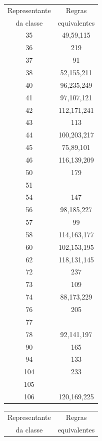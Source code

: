 \documentclass[12pt,a4paper]{article}
\begin{document}
\begin{table}[H]
\begin{minipage}[b]{0.3\linewidth}
\begin{tabular}{|c|c|}
\hline
\footnotesize Representante & \footnotesize Regras \\
{\footnotesize da classe} & \footnotesize equivalentes \\ \hline
35  & 49,59,115 \\ \hline
36  & 219 \\ \hline
37  & 91 \\ \hline
38  & 52,155,211 \\ \hline
40  & 96,235,249 \\ \hline
41  & 97,107,121 \\ \hline
42  & 112,171,241 \\ \hline
43  & 113 \\ \hline
44  & 100,203,217 \\ \hline
45  & 75,89,101 \\ \hline
46  & 116,139,209 \\ \hline
50  & 179 \\ \hline
51  & \\ \hline
54  & 147 \\ \hline
56  & 98,185,227 \\ \hline
57  & 99 \\ \hline
58  & 114,163,177 \\ \hline
60  & 102,153,195 \\ \hline
62  & 118,131,145 \\ \hline
72  & 237 \\ \hline
73  & 109 \\ \hline
74  & 88,173,229 \\ \hline
76  & 205 \\ \hline
77  & \\ \hline
78  & 92,141,197 \\ \hline
90  & 165 \\ \hline
94  & 133 \\ \hline
104 & 233 \\ \hline
105 & \\ \hline
106 & 120,169,225 \\ \hline
\end{tabular}
\end{minipage}
\hspace{0.3cm}
\begin{minipage}[b]{0.3\linewidth}
\centering
\begin{tabular}{|c|c|}
\hline
\footnotesize Representante & \footnotesize Regras \\
{\footnotesize da classe} & \footnotesize equivalentes \\ \hline

\end{tabular}
\end{minipage}
\end{table}
\end{document}

